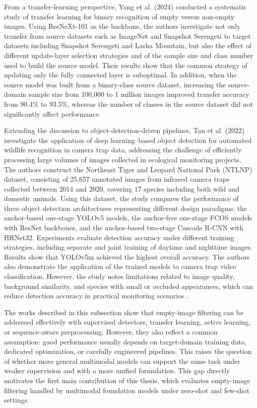 From a transfer-learning perspective, Yang et al. (2024) \cite{yang2024systematic} conducted a systematic study of transfer learning for binary recognition of empty versus non-empty images. Using ResNeXt-101 as the backbone, the authors investigate not only transfer from source datasets such as ImageNet and Snapshot Serengeti to target datasets including Snapshot Serengeti and Lasha Mountain, but also the effect of different update-layer selection strategies and of the sample size and class number used to build the source model. Their results show that the common strategy of updating only the fully connected layer is suboptimal. In addition, when the source model was built from a binary-class source dataset, increasing the source-domain sample size from 100,000 to 1 million images improved transfer accuracy from 90.4\% to 93.5\%, whereas the number of classes in the source dataset did not significantly affect performance.

Extending the discussion to object-detection-driven pipelines, Tan et al. (2022) \citep{tan2022animal} investigate the application of deep learning–based object detection for automated wildlife recognition in camera trap data, addressing the challenge of efficiently processing large volumes of images collected in ecological monitoring projects. The authors construct the Northeast Tiger and Leopard National Park (NTLNP) dataset, consisting of 25,657 annotated images from infrared camera traps collected between 2014 and 2020, covering 17 species including both wild and domestic animals. Using this dataset, the study compares the performance of three object detection architectures representing different design paradigms: the anchor-based one-stage YOLOv5 models, the anchor-free one-stage FCOS models with ResNet backbones, and the anchor-based two-stage Cascade R-CNN with HRNet32. Experiments evaluate detection accuracy under different training strategies, including separate and joint training of daytime and nighttime images. Results show that YOLOv5m achieved the highest overall accuracy. The authors also demonstrate the application of the trained models to camera trap video classification. However, the study notes limitations related to image quality, background similarity, and species with small or occluded appearances, which can reduce detection accuracy in practical monitoring scenarios \citep{tan2022animal}.

The works described in this subsection show that empty-image filtering can be addressed effectively with supervised detectors, transfer learning, active learning, or sequence-aware preprocessing. However, they also reflect a common assumption: good performance usually depends on target-domain training data, dedicated optimization, or carefully engineered pipelines. This raises the question of whether more general multimodal models can support the same task under weaker supervision and with a more unified formulation. This gap directly motivates the first main contribution of this thesis, which evaluates empty-image filtering handled by multimodal foundation models under zero-shot and few-shot settings.

